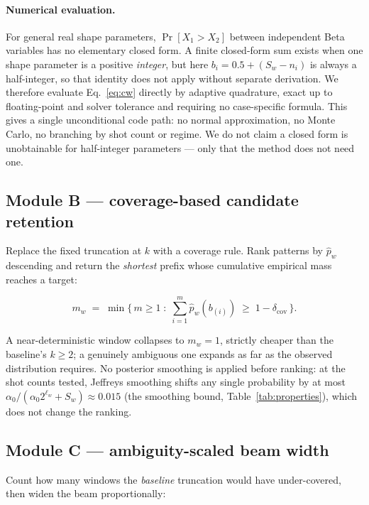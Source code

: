 \documentclass[final,5p,times,longtitle]{elsarticle}
\newcommand{\dcov}{\delta_{\mathrm{cov}}}
\begin{document}
\paragraph{Numerical evaluation.} For general real shape parameters,
$\Pr[X_1>X_2]$ between independent Beta variables has no elementary
closed form. A finite closed-form sum exists when one shape parameter is
a positive \emph{integer}, but here $b_i=0.5+(S_w-n_i)$ is always a
half-integer, so that identity does not apply without separate
derivation. We therefore evaluate Eq.~\eqref{eq:cw} directly by adaptive
quadrature, exact up to floating-point and solver tolerance and requiring
no case-specific formula. This gives a single unconditional code path: no
normal approximation, no Monte Carlo, no branching by shot count or
regime. We do not claim a closed form is unobtainable for half-integer
parameters --- only that the method does not need one.

\subsection{Module B --- coverage-based candidate retention}
\label{sec:moduleB}

Replace the fixed truncation at $k$ with a coverage rule. Rank patterns
by $\hat p_w$ descending and return the \emph{shortest} prefix whose
cumulative empirical mass reaches a target:

\begin{equation}
m_w \;=\; \min\Big\{\, m \ge 1 \;:\; \sum_{i=1}^{m}\hat p_w(b_{(i)}) \;\ge\; 1-\dcov \,\Big\}.
\label{eq:moduleB}
\end{equation}

A near-deterministic window collapses to $m_w=1$, strictly cheaper than
the baseline's $k\ge2$; a genuinely ambiguous one expands as far as the
observed distribution requires. No posterior smoothing is applied before
ranking: at the shot counts tested, Jeffreys smoothing shifts any single
probability by at most $\alpha_0/(\alpha_0 2^{\ell_w}+S_w)\approx0.015$
(the smoothing bound, Table~\ref{tab:properties}), which does not
change the ranking.

\subsection{Module C --- ambiguity-scaled beam width}
\label{sec:moduleC}

Count how many windows the \emph{baseline} truncation would have
under-covered, then widen the beam proportionally:
\end{document}
